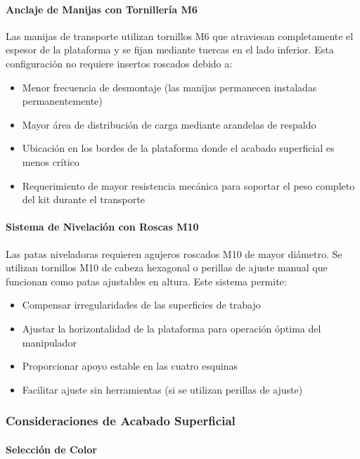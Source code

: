 \paragraph{Anclaje de Manijas con Tornillería M6}

Las manijas de transporte utilizan tornillos M6 que atraviesan completamente el espesor de la plataforma y se fijan mediante tuercas en el lado inferior. Esta configuración no requiere insertos roscados debido a:

\begin{itemize}
    \item Menor frecuencia de desmontaje (las manijas permanecen instaladas permanentemente)
    \item Mayor área de distribución de carga mediante arandelas de respaldo
    \item Ubicación en los bordes de la plataforma donde el acabado superficial es menos crítico
    \item Requerimiento de mayor resistencia mecánica para soportar el peso completo del kit durante el transporte
\end{itemize}

\paragraph{Sistema de Nivelación con Roscas M10}

Las patas niveladoras requieren agujeros roscados M10 de mayor diámetro. Se utilizan tornillos M10 de cabeza hexagonal o perillas de ajuste manual que funcionan como patas ajustables en altura. Este sistema permite:

\begin{itemize}
    \item Compensar irregularidades de las superficies de trabajo
    \item Ajustar la horizontalidad de la plataforma para operación óptima del manipulador
    \item Proporcionar apoyo estable en las cuatro esquinas
    \item Facilitar ajuste sin herramientas (si se utilizan perillas de ajuste)
\end{itemize}

\subsubsection{Consideraciones de Acabado Superficial}

\paragraph{Selección de Color}

